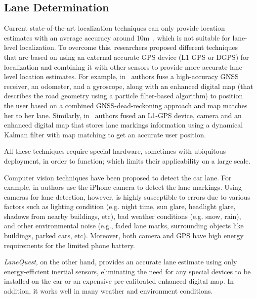\documentclass[10pt, conference, compsocconf]{IEEEtran}
\def \sys {\textit{LaneQuest}}
\begin{document}
\subsection{Lane Determination}
Current state-of-the-art localization techniques can only provide location estimates with an average accuracy around 10m~\cite{aly2013dejavu}, which is not suitable for lane-level localization. To overcome this, researchers proposed different techniques~\cite{toledo2010lane,dao2007markov,selloum2009lane} that are based on using an external accurate GPS device (L1 GPS or DGPS) for localization and combining it with other sensors to provide more accurate lane-level location estimates. For example, in~\cite{toledo2010lane} authors fuse a high-accuracy GNSS receiver, an odometer, and a gyroscope, along with an enhanced digital map (that describes the road geometry using a particle filter-based algorithm) to position the user based on a combined GNSS-dead-reckoning approach and map matches her to her lane. Similarly, in~\cite{tao2013lane} authors fused an L1-GPS device, camera and an enhanced digital map that stores lane markings information using a dynamical Kalman filter with map matching to get an accurate user position.

All these techniques require special hardware, sometimes with ubiquitous deployment, in order to function; which limits their applicability on a large scale.

Computer vision techniques have been proposed to detect the car lane. For example, in  \cite{ren2010lane} authors use the iPhone camera to detect the lane markings. Using cameras for lane detection, however, is highly susceptible to errors due to various factors such as lighting condition (e.g. night time, sun glare, headlight glare, shadows from nearby buildings, etc), bad weather conditions (e.g. snow, rain), and other environmental noise (e.g., faded lane marks, surrounding objects like buildings, parked cars, etc). Moreover, both camera and GPS have high energy requirements for the limited phone battery.

\sys{}, on the other hand, provides an accurate lane estimate using only energy-efficient inertial sensors, eliminating the need for any special devices to be installed on the car or an expensive pre-calibrated enhanced digital map. In addition, it works well in many weather and environment conditions.
\end{document}
